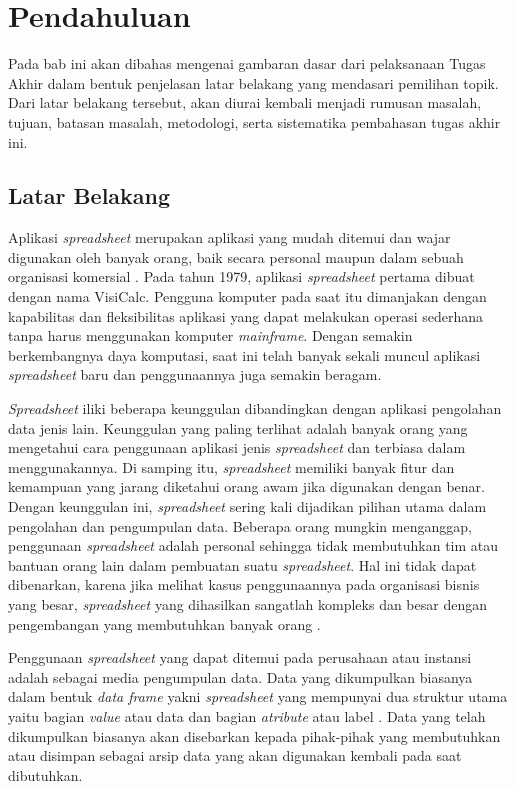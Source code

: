\chapter{Pendahuluan}

Pada bab ini akan dibahas mengenai gambaran dasar dari pelaksanaan Tugas Akhir dalam bentuk penjelasan latar belakang yang mendasari pemilihan topik. Dari latar belakang tersebut, akan diurai kembali menjadi rumusan masalah, tujuan, batasan masalah, metodologi, serta sistematika pembahasan tugas akhir ini.                                                                          

\section{Latar Belakang}

Aplikasi \textit{spreadsheet} merupakan aplikasi yang mudah ditemui dan wajar digunakan oleh banyak orang, baik secara personal maupun dalam sebuah organisasi komersial \citep{Chan1996}. Pada tahun 1979, aplikasi \textit{spreadsheet} pertama dibuat dengan nama VisiCalc. Pengguna komputer pada saat itu dimanjakan dengan kapabilitas dan fleksibilitas aplikasi yang dapat melakukan operasi sederhana tanpa harus menggunakan komputer \textit{mainframe}. Dengan semakin berkembangnya daya komputasi, saat ini telah banyak sekali muncul aplikasi \textit{spreadsheet} baru dan penggunaannya juga semakin beragam.

\textit{Spreadsheet} iliki beberapa keunggulan dibandingkan dengan aplikasi pengolahan data jenis lain. Keunggulan yang paling terlihat adalah banyak orang yang mengetahui cara penggunaan aplikasi jenis \textit{spreadsheet} dan terbiasa dalam menggunakannya. Di samping itu, \textit{spreadsheet} memiliki banyak fitur dan kemampuan yang jarang diketahui orang awam jika digunakan dengan benar. Dengan keunggulan ini, \textit{spreadsheet} sering kali dijadikan pilihan utama dalam pengolahan dan pengumpulan data. Beberapa orang mungkin menganggap, penggunaan \textit{spreadsheet} adalah personal sehingga tidak membutuhkan tim atau bantuan orang lain dalam pembuatan suatu \textit{spreadsheet}. Hal ini tidak dapat dibenarkan, karena jika melihat kasus penggunaannya pada organisasi bisnis yang besar, \textit{spreadsheet} yang dihasilkan sangatlah kompleks dan besar dengan pengembangan yang membutuhkan banyak orang \citep{Panko1998}.

Penggunaan \textit{spreadsheet} yang dapat ditemui pada perusahaan atau instansi adalah sebagai media pengumpulan data. Data yang dikumpulkan biasanya dalam bentuk \textit{data frame} yakni \textit{spreadsheet} yang mempunyai dua struktur utama yaitu bagian \textit{value} atau data dan bagian \textit{atribute} atau label \citep{Chen2013}. Data yang telah dikumpulkan biasanya akan disebarkan kepada pihak-pihak yang membutuhkan atau disimpan sebagai arsip data yang akan digunakan kembali pada saat dibutuhkan.

